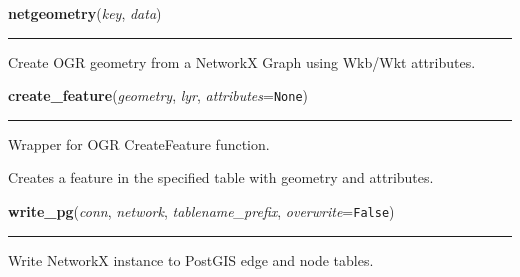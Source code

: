 \hspace{.8\funcindent}\begin{boxedminipage}{\funcwidth}

    \raggedright \textbf{netgeometry}(\textit{key}, \textit{data})

    \vspace{-1.5ex}

    \rule{\textwidth}{0.5\fboxrule}
\setlength{\parskip}{2ex}
    Create OGR geometry from a NetworkX Graph using Wkb/Wkt attributes.

\setlength{\parskip}{1ex}
    \end{boxedminipage}

    \label{nx_pg:create_feature}

    \vspace{0.5ex}

\hspace{.8\funcindent}\begin{boxedminipage}{\funcwidth}

    \raggedright \textbf{create\_feature}(\textit{geometry}, \textit{lyr}, \textit{attributes}={\tt None})

    \vspace{-1.5ex}

    \rule{\textwidth}{0.5\fboxrule}
\setlength{\parskip}{2ex}
    Wrapper for OGR CreateFeature function.

    Creates a feature in the specified table with geometry and attributes.

\setlength{\parskip}{1ex}
    \end{boxedminipage}

    \label{nx_pg:write_pg}

    \vspace{0.5ex}

\hspace{.8\funcindent}\begin{boxedminipage}{\funcwidth}

    \raggedright \textbf{write\_pg}(\textit{conn}, \textit{network}, \textit{tablename\_prefix}, \textit{overwrite}={\tt False})

    \vspace{-1.5ex}

    \rule{\textwidth}{0.5\fboxrule}
\setlength{\parskip}{2ex}
    Write NetworkX instance to PostGIS edge and node tables.

\setlength{\parskip}{1ex}
    \end{boxedminipage}


